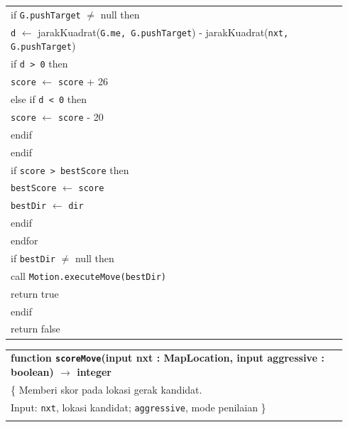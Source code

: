 \documentclass{article}
\newenvironment{pseudobox}
{
\centering
\begin{longtable}{|p{0.94\linewidth}|}
\hline
}
{
\\ \hline
\end{longtable}
\vspace{0.05cm}
}
\begin{document}
\begin{enumerate}[label=\alph*.]
\begin{enumerate}[label=\alph*.]
\begin{pseudobox}
\hspace*{3em}if \texttt{G.pushTarget} $\neq$ null then \\
\hspace*{4.5em}\texttt{d} $\leftarrow$ jarakKuadrat(\texttt{G.me, G.pushTarget}) - jarakKuadrat(\texttt{nxt, G.pushTarget}) \\
\hspace*{4.5em}if \texttt{d > 0} then \\
\hspace*{6em}\texttt{score} $\leftarrow$ \texttt{score} + 26 \\
\hspace*{4.5em}else if \texttt{d < 0} then \\
\hspace*{6em}\texttt{score} $\leftarrow$ \texttt{score} - 20 \\
\hspace*{4.5em}endif \\
\hspace*{3em}endif \\

\hspace*{3em}if \texttt{score > bestScore} then \\
\hspace*{4.5em}\texttt{bestScore} $\leftarrow$ \texttt{score} \\
\hspace*{4.5em}\texttt{bestDir} $\leftarrow$ \texttt{dir} \\
\hspace*{3em}endif \\
\hspace*{1.5em}endfor \\

\hspace*{1.5em}if \texttt{bestDir} $\neq$ null then \\
\hspace*{3em}call \texttt{Motion.executeMove(bestDir)} \\
\hspace*{3em}return true \\
\hspace*{1.5em}endif \\

\hspace*{1.5em}return false
\end{pseudobox}

\begin{pseudobox}
\textbf{function \texttt{scoreMove}(input nxt : MapLocation, input aggressive : boolean) $\rightarrow$ integer} \\
\{ Memberi skor pada lokasi gerak kandidat. \\
Input: \texttt{nxt}, lokasi kandidat; \texttt{aggressive}, mode penilaian
\} \\


\end{pseudobox}
\end{enumerate}
\end{enumerate}
\end{document}
